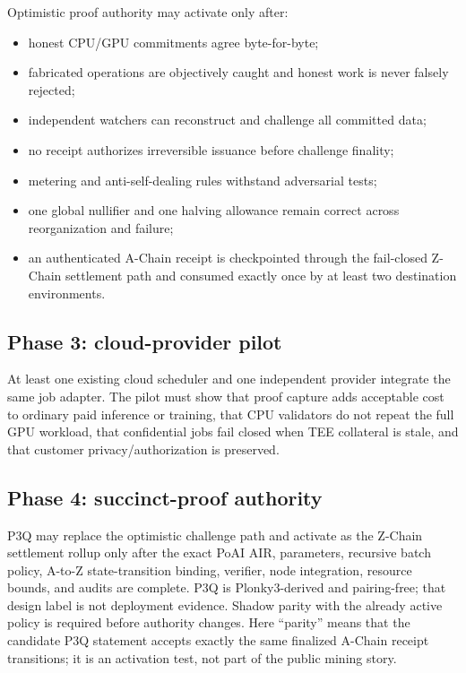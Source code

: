 Optimistic proof authority may activate only after:

\begin{itemize}[leftmargin=1.2em]
  \item honest CPU/GPU commitments agree byte-for-byte;
  \item fabricated operations are objectively caught and honest work is never
        falsely rejected;
  \item independent watchers can reconstruct and challenge all committed data;
  \item no receipt authorizes irreversible issuance before challenge finality;
  \item metering and anti-self-dealing rules withstand adversarial tests;
  \item one global nullifier and one halving allowance remain correct across
        reorganization and failure;
  \item an authenticated A-Chain receipt is checkpointed through the fail-closed
        Z-Chain settlement path and consumed exactly once by at least two
        destination environments.
\end{itemize}

\subsection{Phase 3: cloud-provider pilot}

At least one existing cloud scheduler and one independent provider integrate the
same job adapter. The pilot must show that proof capture adds acceptable cost to
ordinary paid inference or training, that CPU validators do not repeat the full
GPU workload, that confidential jobs fail closed when TEE collateral is stale,
and that customer privacy/authorization is preserved.

\subsection{Phase 4: succinct-proof authority}

P3Q may replace the optimistic challenge path and activate as the Z-Chain
settlement rollup only after the exact PoAI AIR, parameters, recursive batch
policy, A-to-Z state-transition binding, verifier, node integration, resource
bounds, and audits are complete. P3Q is Plonky3-derived and pairing-free; that
design label is not deployment evidence. Shadow parity with the already active
policy is required before authority changes. Here ``parity'' means that the
candidate P3Q statement accepts exactly the same finalized A-Chain receipt
transitions; it is an activation test, not part of the public mining story.

